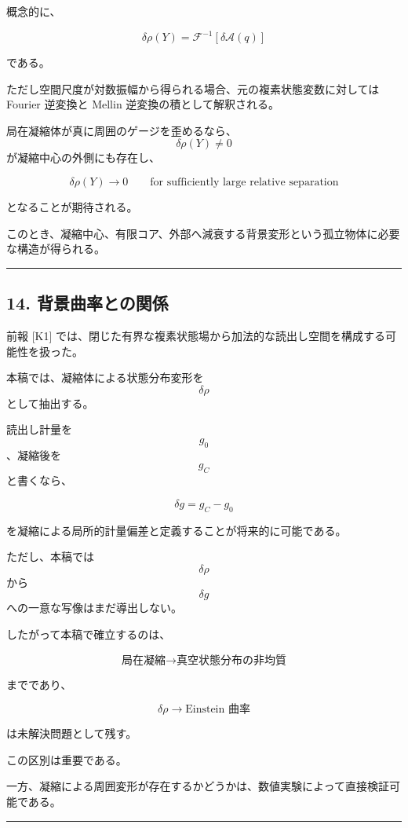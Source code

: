 \documentclass[
  a4paper,
]{ltjsarticle}
\begin{document}
概念的に、

\[
\delta\rho(Y)
=
\mathcal F^{-1}
\left[
\delta\mathcal A(q)
\right]
\tag{40}
\]

である。

ただし空間尺度が対数振幅から得られる場合、元の複素状態変数に対しては
Fourier 逆変換と Mellin 逆変換の積として解釈される。

局在凝縮体が真に周囲のゲージを歪めるなら、\[\delta\rho(Y)\neq0\]
が凝縮中心の外側にも存在し、

\[
\delta\rho(Y)
\to0
\qquad
\text{for sufficiently large relative separation}
\tag{41}
\]

となることが期待される。

このとき、凝縮中心、有限コア、外部へ減衰する背景変形という孤立物体に必要な構造が得られる。

\begin{center}\rule{0.5\linewidth}{0.5pt}\end{center}

\subsection{14.
背景曲率との関係}\label{ux80ccux666fux66f2ux7387ux3068ux306eux95a2ux4fc2}

前報 {[}K1{]}
では、閉じた有界な複素状態場から加法的な読出し空間を構成する可能性を扱った。

本稿では、凝縮体による状態分布変形を \[\delta\rho\] として抽出する。

読出し計量を \[g_0\]、凝縮後を \[g_C\] と書くなら、

\[
\boxed{
\delta g
=
g_C-g_0
}
\tag{42}
\]

を凝縮による局所的計量偏差と定義することが将来的に可能である。

ただし、本稿では \[\delta\rho\] から \[\delta g\]
への一意な写像はまだ導出しない。

したがって本稿で確立するのは、

\[
\boxed{
\text{局在凝縮}
\longrightarrow
\text{真空状態分布の非均質}
}
\]

までであり、

\[
\boxed{
\delta\rho
\longrightarrow
\text{Einstein 曲率}
}
\]

は未解決問題として残す。

この区別は重要である。

一方、凝縮による周囲変形が存在するかどうかは、数値実験によって直接検証可能である。

\begin{center}\rule{0.5\linewidth}{0.5pt}\end{center}
\end{document}

